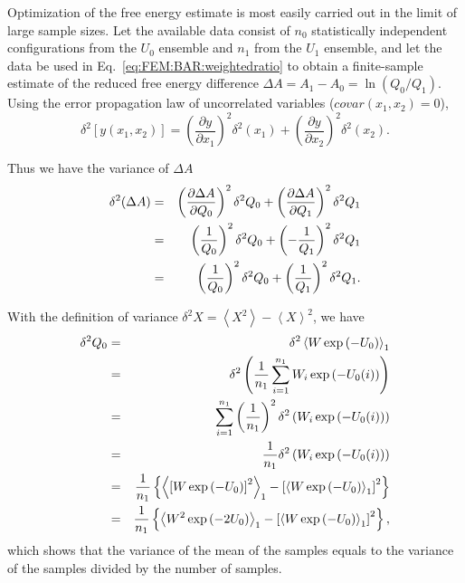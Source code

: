 Optimization of the free energy estimate is most easily carried out in the limit of large sample sizes. Let the available data consist
of $n_{0}$ statistically independent configurations from the $U_{0}$ ensemble and $n_{1}$ from the $U_{1}$ ensemble, and let the data
be used in Eq.~\ref{eq:FEM:BAR:weightedratio} to obtain a finite-sample estimate of the reduced free energy difference $\Delta A=A_{1}-A_{0}=\ln{(Q_{0}/Q_{1})}$.
Using the error propagation law of uncorrelated variables ($covar(x_1,x_2)=0$),\cite{BerendsenBook2011}
\begin{equation}
	\delta^2\left[y(x_{1},x_{2})\right]=\left(\frac{\partial y}{\partial x_{1}}\right)^{2}\delta^2(x_{1})+\left(\frac{\partial y}{\partial x_{2}}\right)^{2}\delta^2(x_{2}).
\end{equation}

Thus we have the variance of $\Delta A$
\begin{eqnarray}
	\delta^2(\Delta A) & = & \left(\frac{\partial\Delta A}{\partial Q_{0}}\right)^{2}\delta^2Q_0+\left(\frac{\partial\Delta A}{\partial Q_{1}}\right)^{2}\delta^2Q_1\notag\\
	& = & \left(\frac{1}{Q_{0}}\right)^{2}\delta^2Q_0+\left(-\frac{1}{Q_{1}}\right)^{2}\delta^2Q_1\notag\\
	& = & \left(\frac{1}{Q_{0}}\right)^{2}\delta^2Q_0+\left(\frac{1}{Q_{1}}\right)^{2}\delta^2Q_1.
\end{eqnarray}

With the definition of variance $\delta^2X=\left\langle X^{2}\right\rangle -\left\langle X\right\rangle ^{2}$,
we have 
\begin{eqnarray}
	\delta^2Q_0 & = & \delta^2\left\langle W\exp{(-U_{0})}\right\rangle_{1}\notag\\
	& = & \delta^2\left(\frac{1}{n_1}\sum_{i=1}^{n_1}W_{i}\exp{\left(-U_{0}(i)\right)}\right)\notag\\
	& = & \sum_{i=1}^{n_{1}}\left(\frac{1}{n_{1}}\right)^{2}\delta^2\left(W_{i}\exp{\left(-U_{0}(i)\right)}\right)\notag\\
	& = & \frac{1}{n_{1}}\delta^2\left(W_{i}\exp{\left(-U_{0}(i)\right)}\right)\notag\\
	& = & \frac{1}{n_{1}}\left\{ \left< \left[W\exp{(-U_{0})}\right]^{2}\right>_{1}-\left[\left< W\exp{(-U_{0})}\right>_{1}\right]^{2}\right\}\notag\\
	& = & \frac{1}{n_{1}}\left\{ \left< W^{2}\exp{(-2U_{0})}\right>_{1}-\left[\left< W\exp{(-U_{0})}\right>_{1}\right]^{2}\right\},
\end{eqnarray}
which shows that the variance of the mean of the samples equals to the variance of the samples divided by the number of samples.

